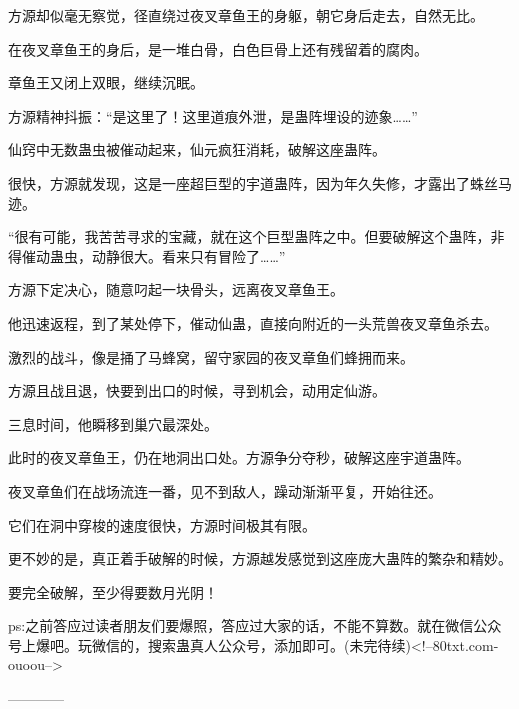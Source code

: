 \begin{this_body}
方源却似毫无察觉，径直绕过夜叉章鱼王的身躯，朝它身后走去，自然无比。

在夜叉章鱼王的身后，是一堆白骨，白色巨骨上还有残留着的腐肉。

章鱼王又闭上双眼，继续沉眠。

方源精神抖振：“是这里了！这里道痕外泄，是蛊阵埋设的迹象……”

仙窍中无数蛊虫被催动起来，仙元疯狂消耗，破解这座蛊阵。

很快，方源就发现，这是一座超巨型的宇道蛊阵，因为年久失修，才露出了蛛丝马迹。

“很有可能，我苦苦寻求的宝藏，就在这个巨型蛊阵之中。但要破解这个蛊阵，非得催动蛊虫，动静很大。看来只有冒险了……”

方源下定决心，随意叼起一块骨头，远离夜叉章鱼王。

他迅速返程，到了某处停下，催动仙蛊，直接向附近的一头荒兽夜叉章鱼杀去。

激烈的战斗，像是捅了马蜂窝，留守家园的夜叉章鱼们蜂拥而来。

方源且战且退，快要到出口的时候，寻到机会，动用定仙游。

三息时间，他瞬移到巢穴最深处。

此时的夜叉章鱼王，仍在地洞出口处。方源争分夺秒，破解这座宇道蛊阵。

夜叉章鱼们在战场流连一番，见不到敌人，躁动渐渐平复，开始往还。

它们在洞中穿梭的速度很快，方源时间极其有限。

更不妙的是，真正着手破解的时候，方源越发感觉到这座庞大蛊阵的繁杂和精妙。

要完全破解，至少得要数月光阴！

ps:之前答应过读者朋友们要爆照，答应过大家的话，不能不算数。就在微信公众号上爆吧。玩微信的，搜索蛊真人公众号，添加即可。(未完待续)<!--80txt.com-ouoou-->

------------

\end{this_body}

